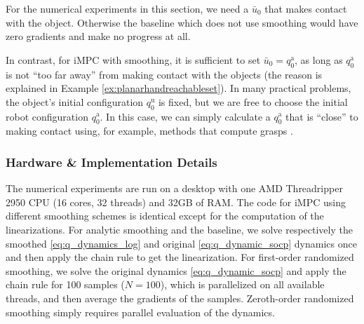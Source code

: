 For the numerical experiments in this section, we need a $\bar{u}_0$ that makes contact with the object. Otherwise the baseline which does not use smoothing would have zero gradients and make no progress at all. 

In contrast, for iMPC with smoothing, it is sufficient to set $\bar{u}_0 = q^\mathrm{a}_0$, as long as $q^\mathrm{a}_0$ is not ``too far away'' from making contact with the objects (the reason is explained in Example \ref{ex:planarhandreachableset}). In many practical problems, the object's initial configuration $q^\mathrm{u}_0$ is fixed, but we are free to choose the initial robot configuration $q^\mathrm{a}_0$. In this case, we can simply calculate a $q^\mathrm{a}_0$ that is ``close'' to making contact using, for example, methods that compute grasps \cite{murray2017mathematical}. 

\subsubsection{Hardware \& Implementation Details}
The numerical experiments are run on a desktop with one AMD Threadripper 2950 CPU (16 cores, 32 threads) and 32GB of RAM. The code for iMPC using different smoothing schemes is identical except for the computation of the linearizations. For analytic smoothing and the baseline, we solve respectively the smoothed \eqref{eq:q_dynamics_log} and original \eqref{eq:q_dynamic_socp} dynamics once and then apply the chain rule to get the linearization. For first-order randomized smoothing, we solve the original dynamics \eqref{eq:q_dynamic_socp} and apply the chain rule for 100 samples ($N=100$), which is parallelized on all available threads, and then average the gradients of the samples. Zeroth-order randomized smoothing simply requires parallel evaluation of the dynamics.


